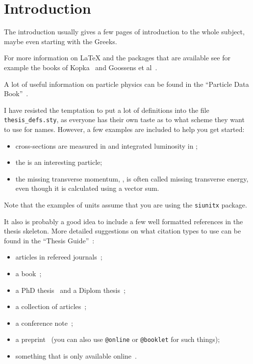 
\chapter{Introduction}
\label{sec:intro}

The introduction usually gives a few pages of introduction to the
whole subject, maybe even starting with the Greeks.

For more information on \LaTeX{} and the packages that are available
see for example the books of Kopka~\cite{kopka04} and Goossens et
al~\cite{goossens04}.

A lot of useful information on particle physics can be found in the
\enquote{Particle Data Book}~\cite{pdg2010}.

I have resisted the temptation to put a lot of definitions into the
file \texttt{thesis\_defs.sty}, as everyone has their own taste as
to what scheme they want to use for names.
However, a few examples are included to help you get started:
\begin{itemize}
\setlength{\itemsep}{0pt}\setlength{\parskip}{0pt}
\item cross-sections are measured in \unit{\pb} and integrated
  luminosity in \unit{\invpb};
\item the \KoS is an interesting particle;
\item the missing transverse momentum, \pTmiss, is often called
  missing transverse energy, even though it is calculated using a vector sum.
\end{itemize}
Note that the examples of units assume that you are using the
\texttt{siunitx} package.

It also is probably a good idea to include a few well formatted
references in the thesis skeleton. More detailed suggestions on what
citation types to use can be found in the \enquote{Thesis Guide}~\cite{thesis-guide}:
\begin{itemize}
\item articles in refereed journals~\cite{pdg2010,Aad:2010ey};
\item a book~\cite{Halzen:1984mc};
\item a PhD thesis~\cite{tlodd:2012} and a Diplom thesis~\cite{mergelmeyer:2011};
\item a collection of articles~\cite{lhc:vol1};
\item a conference note~\cite{ATLAS-CONF-2011-008};
\item a preprint~\cite{atlas:perf:2009} (you can also use
  \texttt{@online} or \texttt{@booklet} for such things);
\item something that is only available online~\cite{thesis-guide}.
\end{itemize}

